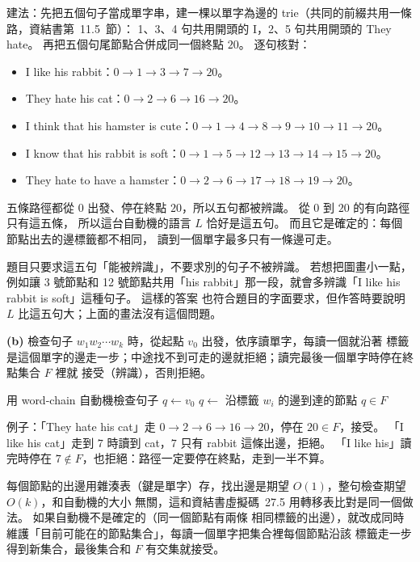\begin{pastsoln}
\begin{center}
\end{center}
建法：先把五個句子當成單字串，建一棵以單字為邊的 trie（共同的前綴共用一條路，資結書第~11.5~節）：
1、3、4 句共用開頭的 I，2、5 句共用開頭的 They hate。 再把五個句尾節點合併成同一個終點 $20$。
逐句核對：
\begin{itemize}
\item I like his rabbit：$0 \to 1 \to 3 \to 7 \to 20$。
\item They hate his cat：$0 \to 2 \to 6 \to 16 \to 20$。
\item I think that his hamster is cute：$0 \to 1 \to 4 \to 8 \to 9 \to 10 \to 11 \to 20$。
\item I know that his rabbit is soft：$0 \to 1 \to 5 \to 12 \to 13 \to 14 \to 15 \to 20$。
\item They hate to have a hamster：$0 \to 2 \to 6 \to 17 \to 18 \to 19 \to 20$。
\end{itemize}
五條路徑都從 $0$ 出發、停在終點 $20$，所以五句都被辨識。 從 $0$ 到 $20$ 的有向路徑只有這五條，
所以這台自動機的語言 $L$ 恰好是這五句。 而且它是確定的：每個節點出去的邊標籤都不相同，
讀到一個單字最多只有一條邊可走。

題目只要求這五句「能被辨識」，不要求別的句子不被辨識。 若想把圖畫小一點，例如讓 3 號節點和
12 號節點共用「his rabbit」那一段，就會多辨識「I like his rabbit is soft」這種句子。 這樣的答案
也符合題目的字面要求，但作答時要說明 $L$ 比這五句大；上面的畫法沒有這個問題。

\textbf{(b)} 檢查句子 $w_1 w_2 \cdots w_k$ 時，從起點 $v_0$ 出發，依序讀單字，每讀一個就沿著
標籤是這個單字的邊走一步；中途找不到可走的邊就拒絕；讀完最後一個單字時停在終點集合 $F$ 裡就
接受（辨識），否則拒絕。
\begin{pseudo}{用 word-chain 自動機檢查句子}
    \State $q \gets v_0$
            \State \Return \FALSE
        \EndIf
        \State $q \gets$ 沿標籤 $w_i$ 的邊到達的節點
    \EndFor
    \State \Return $q \in F$
\EndFunction
\end{pseudo}
例子：「They hate his cat」走 $0 \to 2 \to 6 \to 16 \to 20$，停在 $20 \in F$，接受。
「I like his cat」走到 $7$ 時讀到 cat，$7$ 只有 rabbit 這條出邊，拒絕。 「I like his」讀完時停在
$7 \notin F$，也拒絕：路徑一定要停在終點，走到一半不算。

每個節點的出邊用雜湊表（鍵是單字）存，找出邊是期望 $O(1)$，整句檢查期望 $O(k)$，和自動機的大小
無關，這和資結書虛擬碼~27.5 用轉移表比對是同一個做法。 如果自動機不是確定的（同一個節點有兩條
相同標籤的出邊），就改成同時維護「目前可能在的節點集合」，每讀一個單字把集合裡每個節點沿該
標籤走一步得到新集合，最後集合和 $F$ 有交集就接受。
\end{pastsoln}
